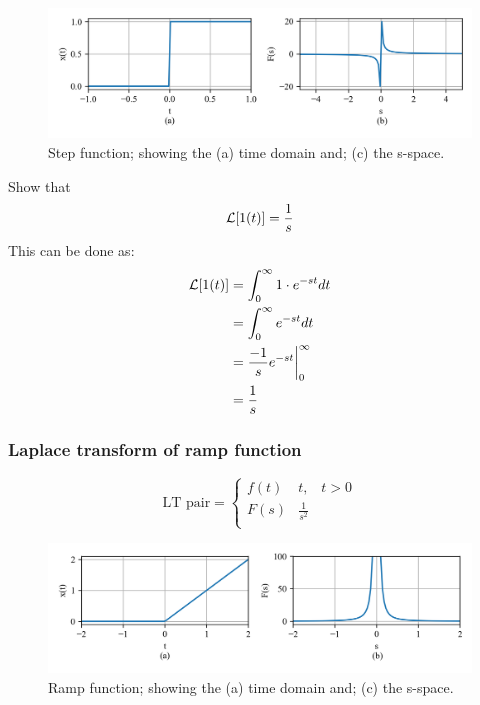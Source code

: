 \documentclass[12pt,letter]{article}
\begin{document}
		\begin{figure}[H]
			\centering
			\includegraphics[width=6.5in]{../figures/T_and_S_space_step_function}
			\caption{Step function; showing the (a) time domain and; (c) the s-space.}
			\label{fig:T_and_S_space_step_function}
		\end{figure}


\begin{mdframed}[middlelinewidth=0.5mm]
\begin{center}
\end{center}
Show that
\begin{equation}
\mathcal{L}{\left[1(t)\right]} = \frac{1}{s}
\end{equation}
This can be done as:
\begin{align}
	\mathcal{L}{\left[1(t)\right]} &=  \int_{0}^{\infty}1 \cdot e^{-st} dt \\ \nonumber
	&= \int_{0}^{\infty}e^{-st} dt  \\ \nonumber
&= \frac{-1}{s}e^{-st}\bigg|^\infty_0 \\ \nonumber
&= \frac{1}{s} 
\end{align}
\end{mdframed}

		\subsubsection{Laplace transform of ramp function}

		\begin{equation}
		\text{LT pair} =
			\begin{cases}
			f(t) & t, \; \; \; t>0 \\
			F(s) & \frac{1}{s^2} \\
			\end{cases}
		\end{equation}

		\begin{figure}[H]
			\centering
			\includegraphics[width=6.5in]{../figures/T_and_S_space_ramp_function}
			\caption{Ramp function; showing the (a) time domain and; (c) the s-space.}
			\label{fig:T_and_S_space_ramp_function}
		\end{figure}
\end{document}
